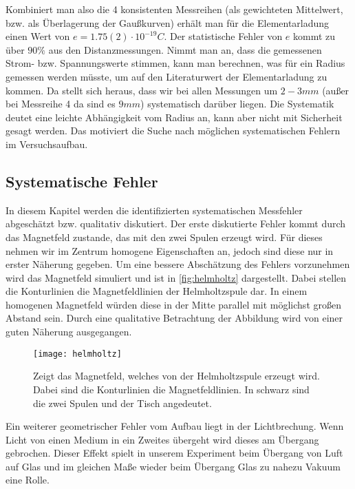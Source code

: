 Kombiniert man also die 4 konsistenten Messreihen (als gewichteten Mittelwert, bzw. als Überlagerung der Gaußkurven) erhält man für die Elementarladung einen Wert von \( e = 1.75(2) \cdot 10^{-19} \unit{C} \). Der statistische Fehler von \( e \) kommt zu über \( 90 \% \) aus den Distanzmessungen. Nimmt man an, dass die gemessenen Strom- bzw. Spannungswerte stimmen, kann man berechnen, was für ein Radius gemessen werden müsste, um auf den Literaturwert der Elementarladung zu kommen. Da stellt sich heraus, dass wir bei allen Messungen um \( 2 - 3 \unit{mm} \) (außer bei Messreihe 4 da sind es \( 9 \unit{mm} \)) systematisch darüber liegen. Die Systematik deutet eine leichte Abhängigkeit vom Radius an, kann aber nicht mit Sicherheit gesagt werden. Das motiviert die Suche nach möglichen systematischen Fehlern im Versuchsaufbau.


\subsection{Systematische Fehler}
In diesem Kapitel werden die identifizierten systematischen Messfehler abgeschätzt bzw. qualitativ diskutiert. Der erste diskutierte Fehler kommt durch das Magnetfeld zustande, das mit den zwei Spulen erzeugt wird. Für dieses nehmen wir im Zentrum homogene Eigenschaften an, jedoch sind diese nur in erster Näherung gegeben. Um eine bessere Abschätzung des Fehlers vorzunehmen wird das Magnetfeld simuliert und ist in \autoref{fig:helmholtz} dargestellt. Dabei stellen die Konturlinien die Magnetfeldlinien der Helmholtzspule dar. In einem homogenen Magnetfeld würden diese in der Mitte parallel mit möglichst großen Abstand sein. Durch eine qualitative Betrachtung der Abbildung wird von einer guten Näherung ausgegangen. 

\begin{figure}[H]
	\texttt{[image: helmholtz]}
	\caption{Zeigt das Magnetfeld, welches von der Helmholtzspule erzeugt wird. Dabei sind die Konturlinien die Magnetfeldlinien. In schwarz sind die zwei Spulen und der Tisch angedeutet.}
	\label{fig:helmholtz}
\end{figure}

\noindent Ein weiterer geometrischer Fehler vom Aufbau liegt in der Lichtbrechung. Wenn Licht von einen Medium in ein Zweites übergeht wird dieses am Übergang gebrochen. Dieser Effekt spielt in unserem Experiment beim Übergang von Luft auf Glas und im gleichen Maße wieder beim Übergang Glas zu nahezu Vakuum eine Rolle. 

